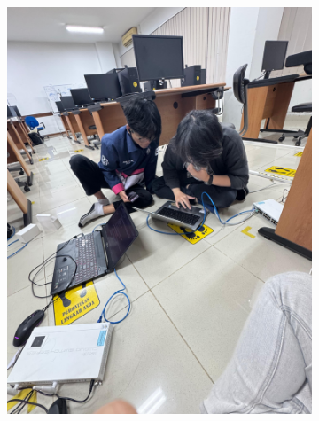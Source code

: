 \begin{figure}[H]
\begin{subfigure}[b]{0.4\linewidth}
		\includegraphics[width=\linewidth]{P3/img/dokum 4.jpg}
	\end{subfigure}
\end{figure}